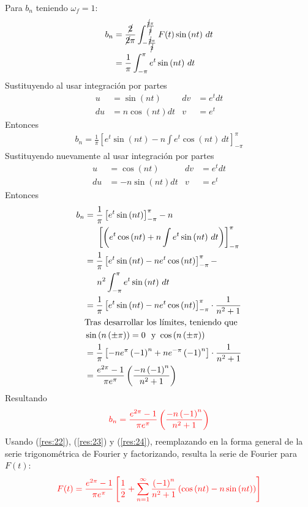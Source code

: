 \begin{multicols}{2}
Para $b_n$ teniendo $\omega_f = 1$:
\begin{align*}
    b_n &= \frac{\cancel{2}}{\cancel{2}\pi} \int_{-\frac{\cancel{2}\pi}{\cancel{2}}}^{\frac{\cancel{2}\pi}{\cancel{2}}} F(t) \sin\left(nt\right) \,dt\\
    &= \frac{1}{\pi} \int_{-\pi}^{\pi} e^{t} \sin\left(nt\right) \,dt
\end{align*}
Sustituyendo al usar integración por partes
\begin{align*}
    u&=\sin\left(nt\right)           &  dv&=e^{t} dt\\
    du&=n\cos\left(nt\right)dt         &  v&=e^{t}
\end{align*}
Entonces
\begin{align*}
    b_n = \frac{1}{\pi} \left[e^{t} \sin\left(nt\right) - n\int e^{t} \cos\left(nt\right) \,dt\right]_{-\pi}^{\pi}
\end{align*}
Sustituyendo nuevamente al usar integración por partes
\begin{align*}
    u&=\cos\left(nt\right)           &  dv&=e^{t} dt\\
    du&=-n\sin\left(nt\right)dt         &  v&=e^{t}
\end{align*}
Entonces
\begin{align*}
    b_n &= \frac{1}{\pi} \left[e^{t} \sin\left(nt\right)\right]_{-\pi}^{\pi} -n\\
    &\hphantom{=}~~ \left[\left(e^{t} \cos\left(nt\right) + n\int e^{t} \sin\left(nt\right) \,dt\right)\right]_{-\pi}^{\pi}\\
    &= \frac{1}{\pi} \left[e^{t} \sin\left(nt\right) - ne^{t}\cos\left(nt\right)\right]_{-\pi}^{\pi} -\\
    &\hphantom{=}~~ n^{2}\int_{-\pi}^{\pi} e^{t} \sin\left(nt\right) \,dt\\
    &= \frac{1}{\pi} \left[e^{t} \sin\left(nt\right) - ne^{t} \cos\left(nt\right)\right]_{-\pi}^{\pi} \cdot \frac{1}{n^{2}+1}\\
    &\textup{Tras desarrollar los límites, teniendo que }\\
    &\sin\left(n\left(\pm \pi\right)\right) = 0~~\mathrm{y}~\cos\left(n\left(\pm \pi\right)\right)\\
    &= \frac{1}{\pi} \left[-ne^{\pi}\left(-1\right)^{n}+ne^{-\pi}\left(-1\right)^{n}\right] \cdot \frac{1}{n^{2}+1}\\
    &= \frac{e^{2\pi}-1}{\pi e^{\pi}} \left(\frac{-n\left(-1\right)^{n}}{n^{2}+1}\right)
\end{align*}
Resultando
\begin{equation}
    \textcolor{rojo}{b_n = \frac{e^{2\pi}-1}{\pi e^{\pi}} \left(\frac{-n\left(-1\right)^{n}}{n^{2}+1}\right)}
    \label{res:24}
\end{equation}
Usando (\ref{res:22}), (\ref{res:23}) y (\ref{res:24}), reemplazando en la forma general de la serie trigonométrica de Fourier y factorizando, resulta la serie de Fourier para $F(t)$:
\begin{equation*}
    \textcolor{rojo}{F(t) = \frac{e^{2\pi}-1}{\pi e^{\pi}} \left[\frac{1}{2} + \sum_{n = 1}^{\infty} \frac{\left(-1\right)^{n}}{n^{2}+1} \left(\cos\left(nt\right) - n\sin\left(nt\right)\right) \right]}
\end{equation*}


\end{multicols}

